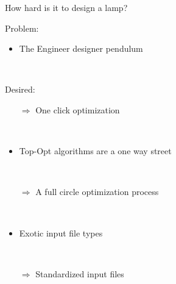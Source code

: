 \begin{frame}{How hard is it to design a lamp?}

	\begin{multicols}{2}
		\begin{block}{Problem:}{
		\begin{itemize}		
			\item The Engineer designer pendulum			
		\end{itemize}~\\
		}
		\end{block}
	
		\vfill
		\columnbreak


		\begin{block}{Desired:}{
		\begin{itemize}		
			\item[$\Rightarrow$] One click optimization				
		\end{itemize}~\\
		}
		\end{block}
				
		\end{multicols}
		\pause
		
	\begin{multicols}{2}

		\begin{itemize}
			\item Top-Opt algorithms are a one way street
		\end{itemize}~\\
		\vfill
		\columnbreak
		\begin{itemize}
			\item[$\Rightarrow$] A full circle optimization process	
		\end{itemize}~\\			
		\end{multicols}
		\pause
	\begin{multicols}{2}

		\begin{itemize}
			\item Exotic input file types
		\end{itemize}~\\
		\vfill
		\columnbreak
		\begin{itemize}
			\item[$\Rightarrow$] Standardized input files	
		\end{itemize}~\\			
		\end{multicols}

\end{frame}	

